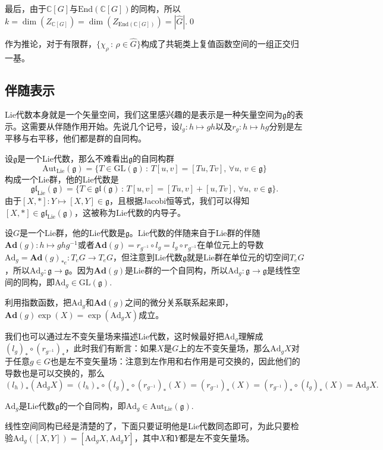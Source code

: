 \documentclass[10pt]{article}
\newcommand{\cc}{\mathbb{C}}
\newcommand{\lag}{{\mathfrak{g}}}
\begin{document}
最后，由于$\cc [G]$与$\mathrm{End}(\cc [G])$的同构，所以$k=\dim (Z_{\cc [G]})=\dim (Z_{\mathrm{End}(\cc [G])})=|\hat{G}|$.\qed

\para 作为推论，对于有限群，$\{\chi_\rho\,:\, \rho\in \hat{G}\}$构成了共轭类上复值函数空间的一组正交归一基。

\subsection*{伴随表示}

Lie代数本身就是一个矢量空间，我们这里感兴趣的是表示是一种矢量空间为$\lag$的表示。这需要从伴随作用开始。先说几个记号，设$l_g:h\mapsto gh$以及$r_g:h\mapsto hg$分别是左平移与右平移，他们都是群的自同构。

\para 设$\lag$是一个Lie代数，那么不难看出$\lag$的自同构群
\[\mathrm{Aut}_{\mathrm{Lie}}(\lag)=\{T\in \mathrm{GL}(\lag)\,:\,T[u,v]=[Tu,Tv],\,\forall u,\,v\in\lag\}\]
构成一个Lie群，他的Lie代数是
\[\mathfrak{gl}_{\mathrm{Lie}}(\lag)=\{T\in \mathfrak{gl}(\lag)\,:\,T[u,v]=[Tu,v]+[u,Tv],\,\forall u,\,v\in\lag\}.\]
由于$[X,*]:Y\mapsto [X,Y]\in \lag$，且根据Jacobi恒等式，我们可以得知$[X,*]\in \mathfrak{gl}_{\mathrm{Lie}}(\lag)$，这被称为Lie代数的内导子。

\para 设$G$是一个Lie群，他的Lie代数是$\lag$。Lie代数的伴随来自于Lie群的伴随$\mathbf{Ad}(g):h\mapsto ghg^{-1}$或者$\mathbf{Ad}(g)=r_{g^{-1}}\circ l_g=l_g\circ r_{g^{-1}}$在单位元上的导数$\mathrm{Ad}_g=\mathbf{Ad}(g)_{*e}:T_eG\to T_eG$，但注意到Lie代数$\lag$就是Lie群在单位元的切空间$T_eG$，所以$\mathrm{Ad}_g:\lag\to \lag$。因为$\mathbf{Ad}(g)$是Lie群的一个自同构，所以$\mathrm{Ad}_g:\lag\to\lag$是线性空间的同构，即$\mathrm{Ad}_g\in \mathrm{GL}(\lag)$.

利用指数函数，把$\mathrm{Ad}_g$和$\mathbf{Ad}(g)$之间的微分关系联系起来即，$\mathbf{Ad}(g)\exp(X)=\exp(\mathrm{Ad}_gX)$成立。

\para 我们也可以通过左不变矢量场来描述Lie代数，这时候最好把$\mathrm{Ad}_g$理解成$(l_g)_*\circ (r_{g^{-1}})_*$，此时我们有断言：如果$X$是$G$上的左不变矢量场，那么$\mathrm{Ad}_gX$对于任意$g\in G$也是左不变矢量场：注意到左作用和右作用是可交换的，因此他们的导数也是可以交换的，那么
\[
	(l_h)_*(\mathrm{Ad}_gX)=(l_h)_*\circ (l_g)_*\circ (r_{g^{-1}})_*(X)=(r_{g^{-1}})_*(X)=(r_{g^{-1}})_*\circ (l_g)_*(X)=\mathrm{Ad}_gX.
\]

\para $\mathrm{Ad}_g$是Lie代数$\lag$的一个自同构，即$\mathrm{Ad}_g\in \mathrm{Aut}_{\mathrm{Lie}}(\lag)$.

线性空间同构已经是清楚的了，下面只要证明他是Lie代数同态即可，为此只要检验$\mathrm{Ad}_g([X,Y])=[\mathrm{Ad}_gX,\mathrm{Ad}_gY]$，其中$X$和$Y$都是左不变矢量场。
\end{document}
